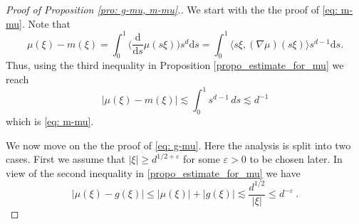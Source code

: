 \documentclass[a4paper, reqno]{amsart}
\theoremstyle{definition}
\newcommand{\dd}{{\mathrm d}}
\begin{document}
\begin{proof}[Proof of Proposition \ref{pro: g-mu, m-mu}.]
We start with the the proof of \eqref{eq: m-mu}. Note that
 \[
\mu(\xi)-m(\xi)=\int_0^1 \bigg( \frac{\dd}{\dd s} \mu(s\xi) \bigg)s^d \dd s=\int_0^1 \langle s\xi, (\nabla \mu)(s\xi)\rangle s^{d-1} \dd s.
 \]
 Thus, using the third inequality in Proposition \ref{propo_estimate_for_mu} we reach
 \[
 |\mu(\xi)-m(\xi)|\lesssim \int_0^1 s^{d-1}\,ds \lesssim d^{-1}
 \]
which is \eqref{eq: m-mu}. 

We now move on the the proof of \eqref{eq: g-mu}. Here the analysis is split into two cases. First we assume that $|\xi|\geq d^{1/2+\varepsilon}$ for some $\varepsilon>0$ to be chosen later. In view of the second inequality in \eqref{propo_estimate_for_mu}  we have 
\begin{equation}
\label{eq: mu-g large xi}
|\mu(\xi)-g(\xi)|\leq |\mu(\xi)|+|g(\xi)|\lesssim \frac{d^{1/2}}{|\xi|}\leq d^{-\varepsilon}~.\end{equation} 



\end{proof}
\end{document}
